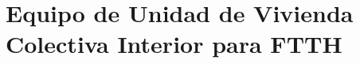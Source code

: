  \section{Equipo de Unidad de Vivienda Colectiva Interior para FTTH}
 \resetallcounters
 
 \clearpage



% 

